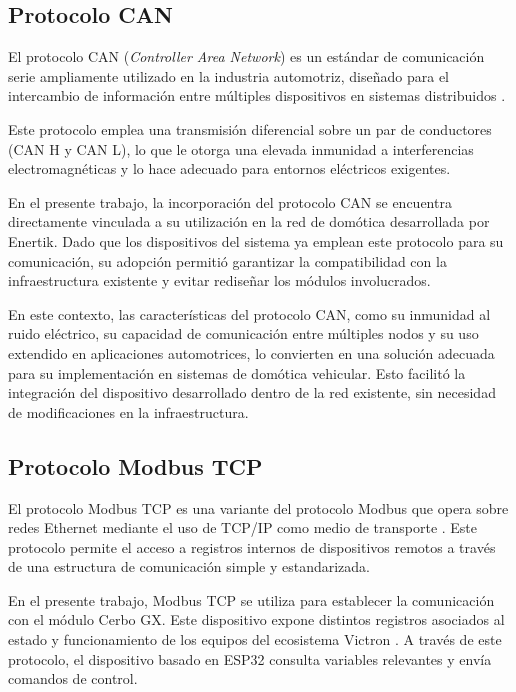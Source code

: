 \subsection{Protocolo CAN}
\label{sec:protocolo_can}

El protocolo CAN (\textit{Controller Area Network}) es un estándar de comunicación serie ampliamente utilizado en la industria automotriz, diseñado para el intercambio de información entre múltiples dispositivos en sistemas distribuidos \citep{web_intro_can}.

Este protocolo emplea una transmisión diferencial sobre un par de conductores (CAN H y CAN L), lo que le otorga una elevada inmunidad a interferencias electromagnéticas y lo hace adecuado para entornos eléctricos exigentes.

En el presente trabajo, la incorporación del protocolo CAN se encuentra directamente vinculada a su utilización en la red de domótica desarrollada por Enertik. Dado que los dispositivos del sistema ya emplean este protocolo para su comunicación, su adopción permitió garantizar la compatibilidad con la infraestructura existente y evitar rediseñar los módulos involucrados.

En este contexto, las características del protocolo CAN, como su inmunidad al ruido eléctrico, su capacidad de comunicación entre múltiples nodos y su uso extendido en aplicaciones automotrices, lo convierten en una solución adecuada para su implementación en sistemas de domótica vehicular. Esto facilitó la integración del dispositivo desarrollado dentro de la red existente, sin necesidad de modificaciones en la infraestructura.

\subsection{Protocolo Modbus TCP}

El protocolo Modbus TCP es una variante del protocolo Modbus que opera sobre redes Ethernet mediante el uso de TCP/IP como medio de transporte \citep{web_tcpip}. Este protocolo permite el acceso a registros internos de dispositivos remotos a través de una estructura de comunicación simple y estandarizada.

En el presente trabajo, Modbus TCP se utiliza para establecer la comunicación con el módulo Cerbo GX. Este dispositivo expone distintos registros asociados al estado y funcionamiento de los equipos del ecosistema Victron \citep{web_victron_modbus}. A través de este protocolo, el dispositivo basado en ESP32 consulta variables relevantes y envía comandos de control.

